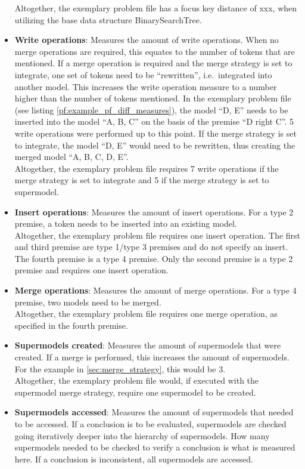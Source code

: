 \documentclass[hidelinks]{scrartcl}
\begin{document}
\begin{itemize}
	Altogether, the exemplary problem file has a focus key distance of xxx, when utilizing the base data structure BinarySearchTree.
	\item \textbf{Write operations}: Measures the amount of write operations. When no merge operations are required, this equates to the number of \gls{token}s that are mentioned. If a merge operation is required and the merge strategy is set to integrate, one set of \gls{token}s need to be ``rewritten'', i.e.\ integrated into another model. This increases the write operation measure to a number higher than the number of \gls{token}s mentioned. In the exemplary problem file (see listing \ref{pf:example_pf_diff_measures}), the model ``D, E'' needs to be inserted into the model ``A, B, C'' on the basis of the premise ``D right C''. 5 write operations were performed up to this point. If the merge strategy is set to integrate, the model ``D, E'' would need to be rewritten, thus creating the merged model ``A, B, C, D, E''.\\
	Altogether, the exemplary problem file requires 7 write operations if the merge strategy is set to integrate and 5 if the merge strategy is set to supermodel.
	\item \textbf{Insert operations}: Measures the amount of insert operations. For a type 2 \gls{premise}, a \gls{token} needs to be inserted into an existing model. \\
	Altogether, the exemplary problem file requires one insert operation. The first and third \gls{premise} are type 1/type 3 \gls{premise}s and do not specify an insert. The fourth \gls{premise} is a type 4 \gls{premise}. Only the second \gls{premise} is a type 2 \gls{premise} and requires one insert operation.
	\item \textbf{Merge operations}: Measures the amount of merge operations. For a type 4 \gls{premise}, two models need to be merged. \\
	Altogether, the exemplary problem file requires one merge operation, as specified in the fourth \gls{premise}.
	\item \textbf{Supermodels created}: Measures the amount of supermodels that were created. If a merge is performed, this increases the amount of supermodels. For the example in \ref{sec:merge_strategy}, this would be 3. \\
	Altogether, the exemplary problem file would, if executed with the supermodel merge strategy, require one supermodel to be created.
	\item \textbf{Supermodels accessed}: Measures the amount of supermodels that needed to be accessed. If a conclusion is to be evaluated, supermodels are checked going iteratively deeper into the hierarchy of supermodels. How many supermodels needed to be checked to verify a conclusion is what is measured here. If a conclusion is inconsistent, all supermodels are accessed. \\

\end{itemize}
\end{document}
